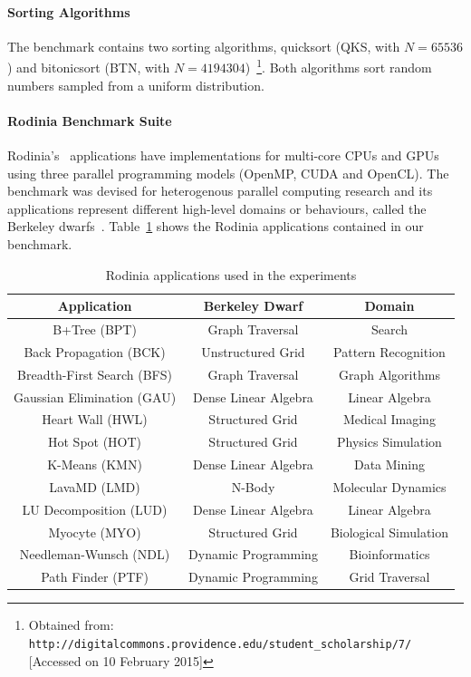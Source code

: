 \paragraph{Sorting Algorithms} The benchmark contains two sorting algorithms,
quicksort (QKS, with $N = 65536$) and bitonicsort (BTN, with $N =
4194304$)~\footnote{Obtained from: \texttt{\scriptsize
http://digitalcommons.providence.edu/student\_scholarship/7/} [Accessed on 10
February 2015]}.  Both algorithms sort random numbers sampled from a uniform
distribution.

\paragraph{Rodinia Benchmark Suite} Rodinia's~\cite{che2009rodinia}
applications have implementations for multi-core CPUs and GPUs using three
parallel programming models (OpenMP, CUDA and OpenCL). The benchmark was
devised for heterogenous parallel computing research and its applications
represent different high-level domains or behaviours, called the Berkeley
dwarfs~\cite{asanovic2006landscape, asanovic2009view}.
Table~\ref{tab:Rodinia} shows the Rodinia applications contained in our
benchmark.

\begin{table}[htpb]
    \centering
    \footnotesize
        \begin{tabular}{ccc}
            \toprule
            \textbf{Application} & \textbf{Berkeley Dwarf\cite{asanovic2009view}} & \textbf{Domain} \\\midrule
            B+Tree (BPT) & Graph Traversal& Search \\\midrule
            Back Propagation (BCK) & Unstructured Grid & Pattern Recognition \\\midrule
            Breadth-First Search (BFS) & Graph Traversal & Graph Algorithms \\\midrule
            Gaussian Elimination (GAU) & Dense Linear Algebra & Linear Algebra \\\midrule
            Heart Wall (HWL) & Structured Grid & Medical Imaging \\\midrule
            Hot Spot (HOT) & Structured Grid & Physics Simulation \\\midrule
            K-Means (KMN) & Dense Linear Algebra & Data Mining \\\midrule
            LavaMD (LMD) & N-Body & Molecular Dynamics \\\midrule
            LU Decomposition (LUD) & Dense Linear Algebra & Linear Algebra \\\midrule
            Myocyte (MYO) & Structured Grid & Biological Simulation \\\midrule
            Needleman-Wunsch (NDL) & Dynamic Programming & Bioinformatics \\\midrule
            Path Finder (PTF) & Dynamic Programming & Grid Traversal \\\bottomrule
        \end{tabular}
    \caption{Rodinia applications used in the experiments}
    \label{tab:Rodinia}
\end{table}

